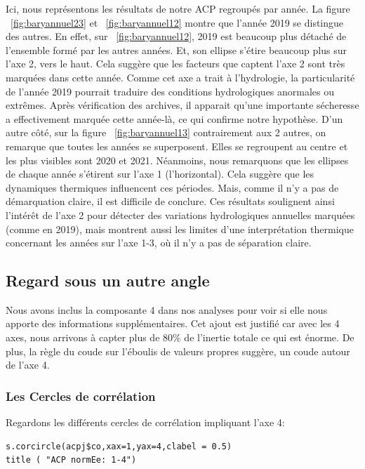 \documentclass[a4paper,12pt]{report}%
\begin{document}
Ici, nous représentons les résultats de notre ACP regroupés par année.  
La figure  ~\ref{fig:baryannuel23}  et ~\ref{fig:baryannuel12} montre que l'année 2019 se distingue des autres. En effet, sur ~\ref{fig:baryannuel12}, 2019 est beaucoup plus détaché de l'ensemble formé par les autres années. Et, son ellipse s'étire beaucoup plus sur l'axe 2, vers le haut. Cela suggère que les facteurs que captent l'axe 2 sont très marquées dans cette année. Comme cet axe a trait à l'hydrologie, la particularité de l'année 2019 pourrait traduire des conditions hydrologiques anormales ou extrêmes. Après vérification des archives, il apparait qu'une importante sécheresse a effectivement marquée cette année-là, ce qui confirme notre hypothèse.
D'un autre côté, sur la figure ~\ref{fig:baryannuel13} contrairement aux 2 autres, on remarque que toutes les années se superposent.  Elles se regroupent au centre et les plus visibles sont 2020 et 2021. Néanmoins, nous remarquons que les ellipses de chaque année s'étirent sur l'axe 1 (l'horizontal). Cela suggère que les dynamiques thermiques influencent ces périodes. Mais, comme il n'y a pas de démarquation claire, il est difficile de conclure. 
Ces résultats soulignent ainsi l'intérêt de l'axe 2 pour détecter des variations hydrologiques annuelles marquées (comme en 2019), mais montrent aussi les limites d'une interprétation thermique concernant les années sur l'axe 1-3, où il n'y a pas de séparation claire.

\subsection{Regard sous un autre angle}

Nous avons inclus la composante 4 dans nos analyses pour voir si elle nous apporte des informations supplémentaires. Cet ajout est justifié car avec les 4 axes, nous arrivons à capter plus de 80\% de l'inertie totale ce qui est énorme. De plus, la règle du coude sur l'éboulis de valeurs propres suggère, un coude autour de l'axe 4.


\subsubsection{Les Cercles de corrélation }
Regardons les différents cercles de corrélation impliquant l'axe 4:

\begin{lstlisting}
s.corcircle(acpj$co,xax=1,yax=4,clabel = 0.5)
title ( "ACP normEe: 1-4")
\end{lstlisting}
\end{document}
